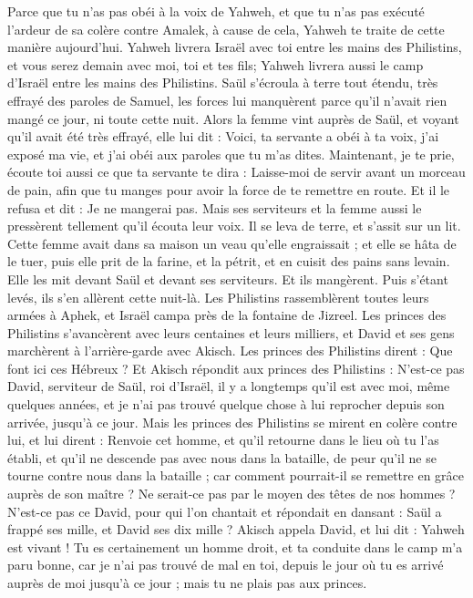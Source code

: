 \begin{multicols}{2}
Parce que tu n'as pas obéi à la voix de Yahweh, et que tu n'as pas exécuté l'ardeur de sa colère contre Amalek, à cause de cela, Yahweh te traite de cette manière aujourd'hui.
Yahweh livrera Israël avec toi entre les mains des Philistins, et vous serez demain avec moi, toi et tes fils; Yahweh livrera aussi le camp d'Israël entre les mains des Philistins.
Saül s’écroula à terre tout étendu, très effrayé des paroles de Samuel, les forces lui manquèrent parce qu'il n'avait rien mangé ce jour, ni toute cette nuit.
Alors la femme vint auprès de Saül, et voyant qu'il avait été très effrayé, elle lui dit : Voici, ta servante a obéi à ta voix, j'ai exposé ma vie, et j'ai obéi aux paroles que tu m'as dites.
Maintenant, je te prie, écoute toi aussi ce que ta servante te dira : Laisse-moi de servir avant un morceau de pain, afin que tu manges pour avoir la force de te remettre en route.
Et il le refusa et dit : Je ne mangerai pas. Mais ses serviteurs et la femme aussi le pressèrent tellement qu'il écouta leur voix. Il se leva de terre, et s'assit sur un lit.
Cette femme avait dans sa maison un veau qu'elle engraissait ; et elle se hâta de le tuer, puis elle prit de la farine, et la pétrit, et en cuisit des pains sans levain.
Elle les mit devant Saül et devant ses serviteurs. Et ils mangèrent. Puis s'étant levés, ils s'en allèrent cette nuit-là.
\VerseOne{}Les Philistins rassemblèrent toutes leurs armées à Aphek, et Israël campa près de la fontaine de Jizreel.
Les princes des Philistins s’avancèrent avec leurs centaines et leurs milliers, et David et ses gens marchèrent à l'arrière-garde avec Akisch.
Les princes des Philistins dirent : Que font ici ces Hébreux ? Et Akisch répondit aux princes des Philistins : N'est-ce pas David, serviteur de Saül, roi d'Israël, il y a longtemps qu’il est avec moi, même quelques années, et je n'ai pas trouvé quelque chose à lui reprocher depuis son arrivée, jusqu'à ce jour.
Mais les princes des Philistins se mirent en colère contre lui, et lui dirent : Renvoie cet homme, et qu'il retourne dans le lieu où tu l'as établi, et qu'il ne descende pas avec nous dans la bataille, de peur qu'il ne se tourne contre nous dans la bataille ; car comment pourrait-il se remettre en grâce auprès de son maître ? Ne serait-ce pas par le moyen des têtes de nos hommes ?
N'est-ce pas ce David, pour qui l’on chantait et répondait en dansant : Saül a frappé ses mille, et David ses dix mille ?
Akisch appela David, et lui dit : Yahweh est vivant ! Tu es certainement un homme droit, et ta conduite dans le camp m'a paru bonne, car je n'ai pas trouvé de mal en toi, depuis le jour où tu es arrivé auprès de moi jusqu'à ce jour ; mais tu ne plais pas aux princes.

\end{multicols}
